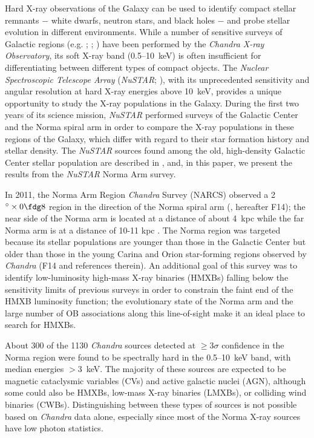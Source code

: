 \documentclass[iop,revtex4]{emulateapj}
\begin{document}
Hard X-ray observations of the Galaxy can be used to identify compact stellar remnants $-$ white dwarfs, neutron stars, and black holes $-$ and probe stellar evolution in different environments.  While a number of sensitive surveys of Galactic regions (e.g. \citealt{muno09}; \citealt{townsley11}; \citealt{fornasini14}) have been performed by the \textit{Chandra X-ray Observatory}, its soft X-ray band (0.5--10~keV) is often insufficient for differentiating between different types of compact objects.  The \textit{Nuclear Spectroscopic Telescope Array} (\textit{NuSTAR}; \citealt{harrison13}), with its unprecedented sensitivity and angular resolution at hard X-ray energies above 10~keV, provides a unique opportunity to study the X-ray populations in the Galaxy.  During the first two years of its science mission, \textit{NuSTAR} performed surveys of the Galactic Center and the Norma spiral arm in order to compare the X-ray populations in these regions of the Galaxy, which differ with regard to their star formation history and stellar density.  The \textit{NuSTAR} sources found among the old, high-density Galactic Center stellar population are described in \citet{hong16}, and, in this paper, we present the results from the \textit{NuSTAR} Norma Arm survey. \par
In 2011, the Norma Arm Region \textit{Chandra} Survey (NARCS) observed a 2$^{\circ} \times 0\fdg8$ region in the direction of the Norma spiral arm (\citealt{fornasini14}, hereafter F14); the near side of the Norma arm is located at a distance of about 4~kpc while the far Norma arm is at a distance of 10-11 kpc \citep{vallee08}.  The Norma region was targeted because its stellar populations are younger than those in the Galactic Center but older than those in the young Carina and Orion star-forming regions observed by \textit{Chandra} (F14 and references therein).  An additional goal of this survey was to identify low-luminosity high-mass X-ray binaries (HMXBs) falling below the sensitivity limits of previous surveys in order to constrain the faint end of the HMXB luminosity function; the evolutionary state of the Norma arm and the large number of OB associations along this line-of-sight \citep{bodaghee12} make it an ideal place to search for HMXBs. \par  About 300 of the 1130 \textit{Chandra} sources detected at $\geq3\sigma$ confidence in the Norma region were found to be spectrally hard in the 0.5--10~keV band, with median energies $>$3~keV. The majority of these sources are expected to be magnetic cataclysmic variables (CVs) and active galactic nuclei (AGN), although some could also be HMXBs, low-mass X-ray binaries (LMXBs), or colliding wind binaries (CWBs).  Distinguishing between these types of sources is not possible based on \textit{Chandra} data alone, especially since most of the Norma X-ray sources have low photon statistics. \par
\end{document}
